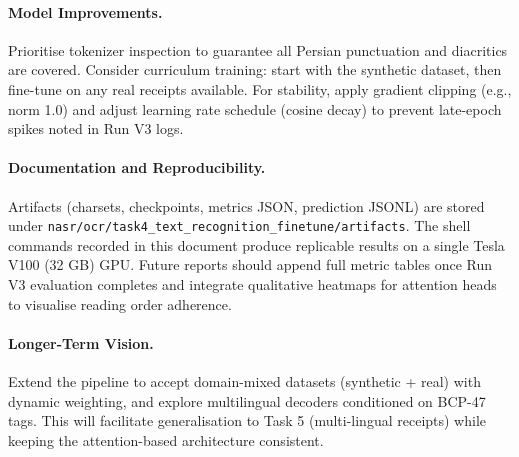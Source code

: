 \documentclass[11pt,a4paper]{article}
\begin{document}
\paragraph{Model Improvements.} Prioritise tokenizer inspection to guarantee all Persian punctuation and diacritics are covered. Consider curriculum training: start with the synthetic dataset, then fine-tune on any real receipts available. For stability, apply gradient clipping (e.g., norm 1.0) and adjust learning rate schedule (cosine decay) to prevent late-epoch spikes noted in Run V3 logs.

\paragraph{Documentation and Reproducibility.} Artifacts (charsets, checkpoints, metrics JSON, prediction JSONL) are stored under \texttt{nasr/ocr/task4\_text\_recognition\_finetune/artifacts}. The shell commands recorded in this document produce replicable results on a single Tesla V100 (32 GB) GPU. Future reports should append full metric tables once Run V3 evaluation completes and integrate qualitative heatmaps for attention heads to visualise reading order adherence.

\paragraph{Longer-Term Vision.} Extend the pipeline to accept domain-mixed datasets (synthetic + real) with dynamic weighting, and explore multilingual decoders conditioned on BCP-47 tags. This will facilitate generalisation to Task 5 (multi-lingual receipts) while keeping the attention-based architecture consistent.
\end{document}
